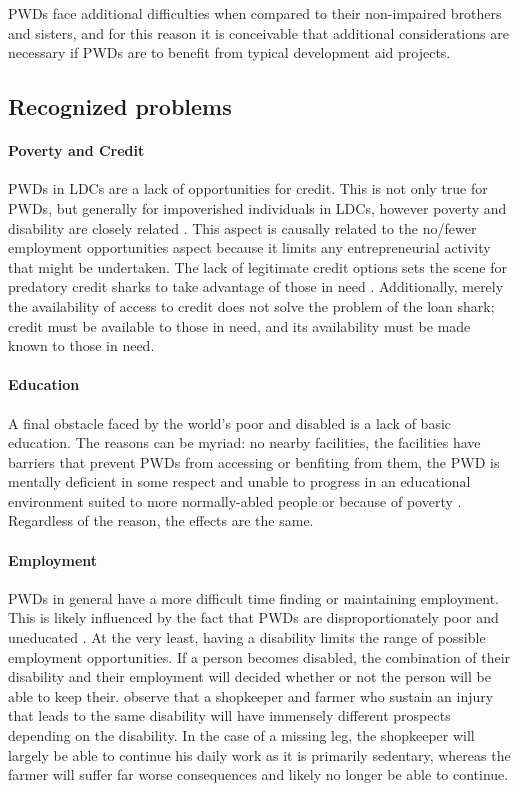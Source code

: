 \documentclass[a4paper]{article}
\begin{document}
PWDs face additional difficulties when compared to their non-impaired brothers
and sisters, and for this reason it is conceivable that additional
considerations are necessary if PWDs are to benefit from typical development
aid projects.


\subsection{Recognized problems}


\paragraph{Poverty and Credit}

PWDs in LDCs are a lack of opportunities for credit. This is not only true for
PWDs, but generally for impoverished individuals in LDCs, however poverty and
disability are closely related \citep{palmer2011disability}. This aspect is
causally related to the no/fewer employment opportunities aspect because it
limits any entrepreneurial activity that might be undertaken. The lack of
legitimate credit options sets the scene for predatory credit sharks to take
advantage of those in need \citep{beisland2017exploring}. Additionally, merely
the availability of access to credit does not solve the problem of the loan
shark; credit must be available to those in need, and its availability must be
made known to those in need.

\paragraph{Education}

A final obstacle faced by the world’s poor and disabled is a lack of basic
education. The reasons can be myriad: no nearby facilities, the facilities
have barriers that prevent PWDs from accessing or benfiting from them, the PWD
is mentally deficient in some respect and unable to progress in an educational
environment suited to more normally-abled people or because of poverty
\citep{ingstad}. Regardless of the reason,
the effects are the same.

\paragraph{Employment}

PWDs in general have a more difficult time finding or maintaining employment.
This is likely influenced by the fact that PWDs are disproportionately poor and
uneducated \cite{lamichhane2014nexus}. At the very least, having a disability
limits the range of possible employment opportunities. If a person becomes
disabled, the combination of their disability and their employment will decided
whether or not the person will be able to keep their.
\cite{chowdhury2006economics} observe that a shopkeeper and farmer who sustain
an injury that leads to the same disability will have immensely different
prospects depending on the disability. In the case of a missing leg, the
shopkeeper will largely be able to continue his daily work as it is primarily
sedentary, whereas the farmer will suffer far worse consequences and likely no
longer be able to continue.
\end{document}
